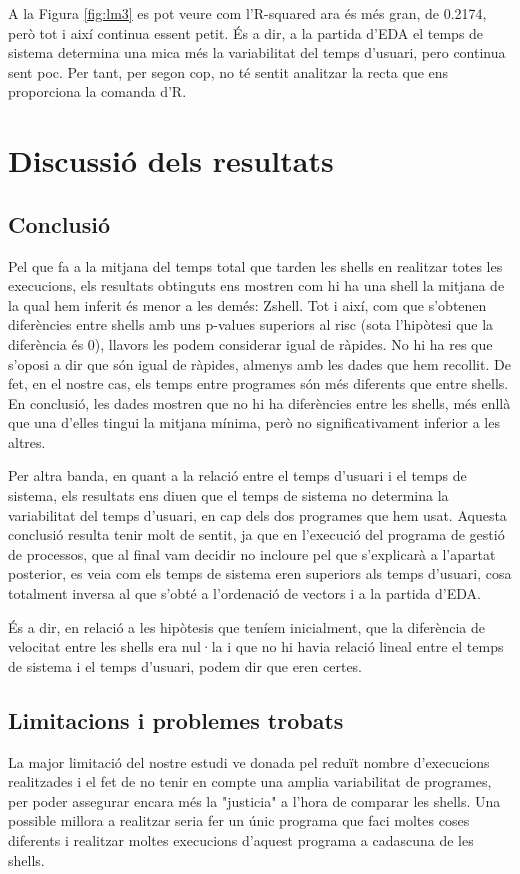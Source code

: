 \documentclass[12pt]{article}
\begin{document}
A la Figura \ref{fig:lm3} es pot veure com l'R-squared ara és més gran, de 0.2174, però tot i així continua essent petit. És a dir, a la
partida d'EDA el temps de sistema determina una mica més la variabilitat del temps d'usuari, pero continua sent poc. Per tant, per segon cop,
no té sentit analitzar la recta que ens proporciona la comanda d'R.

\section{Discussió dels resultats}
\subsection{Conclusió}
Pel que fa a la mitjana del temps total que tarden les shells en realitzar totes les execucions, els resultats obtinguts ens mostren com hi ha una shell la mitjana 
de la qual hem inferit és menor a les demés: Zshell. Tot i així, com que s'obtenen diferències entre shells amb uns p-values superiors al risc (sota l'hipòtesi que la
diferència és 0), llavors les podem considerar igual de ràpides. No hi ha res que s'oposi a dir que són igual de ràpides, almenys amb les dades que hem recollit. De fet, en el 
nostre cas, els temps entre programes són més diferents que entre shells. En conclusió, les dades mostren que no hi ha diferències entre les shells, més enllà que una d'elles
tingui la mitjana mínima, però no significativament inferior a les altres. \break

Per altra banda, en quant a la relació entre el temps d'usuari i el temps de sistema, els resultats ens diuen que el temps de sistema no determina la variabilitat 
del temps d'usuari, en cap dels dos programes que hem usat. Aquesta conclusió resulta tenir molt de sentit, ja que en l'execució del programa de gestió de processos, que 
al final vam decidir no incloure pel que s'explicarà a l'apartat posterior, es veia com els temps de sistema eren superiors als temps d'usuari, cosa totalment inversa al que 
s'obté a l'ordenació de vectors i a la partida d'EDA.

És a dir, en relació a les hipòtesis que teníem inicialment, que la diferència de velocitat entre les shells era nul·la i que no hi havia relació lineal entre el temps de sistema
i el temps d'usuari, podem dir que eren certes.

\subsection{Limitacions i problemes trobats}
La major limitació del nostre estudi ve donada pel reduït nombre d'execucions realitzades i el fet de no tenir en compte una amplia variabilitat de programes, per poder assegurar
encara més la "justicia" a l'hora de comparar les shells. Una possible millora a realitzar seria fer un únic programa que faci moltes coses diferents i realitzar moltes execucions
d'aquest programa a cadascuna de les shells.
\end{document}
